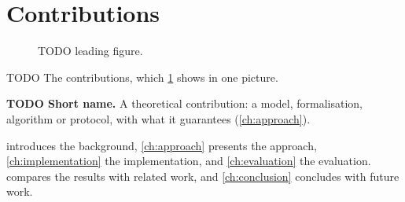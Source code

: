 \section{Contributions}
\begin{figure}[!ht]
  \centering
  \caption{TODO leading figure.}
  \label{fig:overview}
\end{figure}

TODO The contributions, which \cref{fig:overview} shows in one picture.
\begin{contributions}
  \item\label{c:method} \textbf{TODO Short name.} A theoretical contribution: a model, formalisation, algorithm or protocol, with what it guarantees (\cref{ch:approach}).
\end{contributions}

 introduces the background, \cref{ch:approach} presents the approach, \cref{ch:implementation} the implementation, and \cref{ch:evaluation} the evaluation.  compares the results with related work, and \cref{ch:conclusion} concludes with future work.
